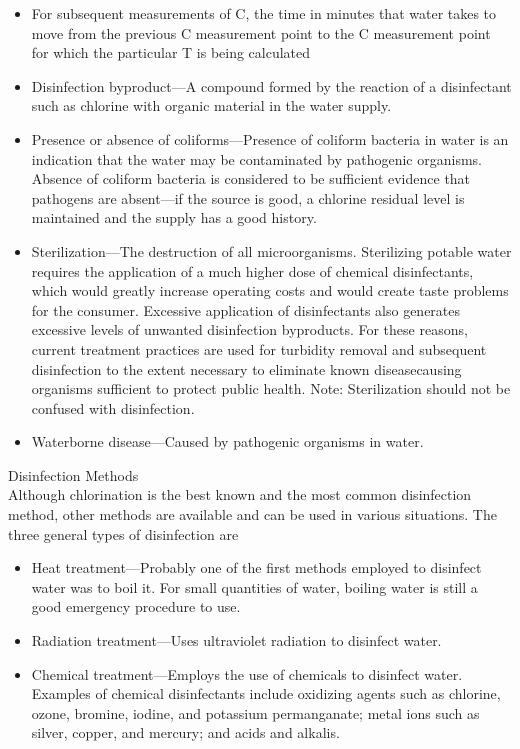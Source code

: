 \begin{itemize}
\item For subsequent measurements of C, the time in minutes that water takes to move from the previous C measurement point to the C measurement point for which the particular T is being calculated
\item Disinfection byproduct—A compound formed by the reaction of a disinfectant such as chlorine with organic material in the water supply.
\item Presence or absence of coliforms—Presence of coliform bacteria in water is an indication that the water may be contaminated by pathogenic organisms. Absence of coliform bacteria is considered to be sufficient evidence that pathogens are absent—if the source is good, a chlorine residual level is maintained and the supply has a good history.
\item Sterilization—The destruction of all microorganisms. Sterilizing potable water requires the application of a much higher dose of chemical disinfectants, which would greatly increase operating costs and would create taste problems for the consumer. Excessive application of disinfectants also generates excessive levels of unwanted disinfection byproducts. For these reasons, current treatment practices are used for turbidity removal and subsequent disinfection to the extent necessary to eliminate known diseasecausing organisms sufficient to protect public health.
Note: Sterilization should not be confused with disinfection.
\item Waterborne disease—Caused by pathogenic organisms in water.
\end{itemize}
Disinfection Methods\\
Although chlorination is the best known and the most common disinfection method, other methods are available and can be used in various situations. The three general types of disinfection are
\begin{itemize}
\item Heat treatment—Probably one of the first methods employed to disinfect water was to boil it. For small quantities of water, boiling water is still a good emergency procedure to use.
\item Radiation treatment—Uses ultraviolet radiation to disinfect water.
\item Chemical treatment—Employs the use of chemicals to disinfect water. Examples of chemical disinfectants include oxidizing agents such as chlorine, ozone, bromine, iodine, and potassium permanganate; metal ions such as silver, copper, and mercury; and acids and alkalis.
\end{itemize}
